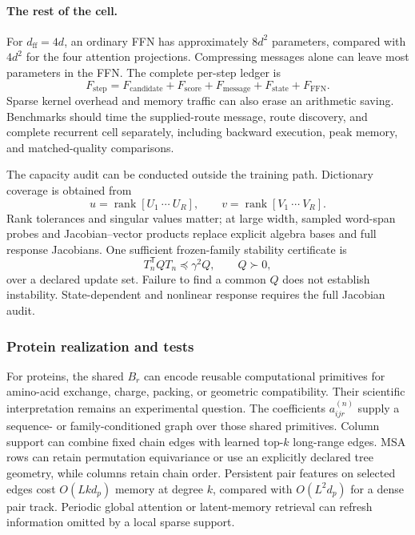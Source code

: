 \documentclass[10pt]{article}
\theoremstyle{definition}
\theoremstyle{remark}
\newcommand{\BookSubsection}[1]{\subsubsection{#1}}
\begin{document}
\paragraph{The rest of the cell.}
For $d_{\mathrm{ff}}=4d$, an ordinary FFN has approximately $8d^2$ parameters, compared with
$4d^2$ for the four attention projections.  Compressing messages alone can leave most parameters
in the FFN.  The complete per-step ledger is
\begin{equation}
F_{\mathrm{step}}
=F_{\mathrm{candidate}}+F_{\mathrm{score}}+F_{\mathrm{message}}
+F_{\mathrm{state}}+F_{\mathrm{FFN}}.
\label{eq:computational-cost-ledger}
\end{equation}
Sparse kernel overhead and memory traffic can also erase an arithmetic saving.  Benchmarks
should time the supplied-route message, route discovery, and complete recurrent cell separately,
including backward execution, peak memory, and matched-quality comparisons.

The capacity audit can be conducted outside the training path.  Dictionary coverage is obtained
from
\begin{equation}
u=\operatorname{rank}[U_1\ \cdots\ U_R],
\qquad
v=\operatorname{rank}[V_1\ \cdots\ V_R].
\label{eq:dictionary-coverage-rank-audit}
\end{equation}
Rank tolerances and singular values matter; at large width, sampled word-span probes and
Jacobian--vector products replace explicit algebra bases and full response Jacobians.  One
sufficient frozen-family stability certificate is
\begin{equation}
T_n^{\mathsf T}QT_n\preceq\gamma^2Q,
\qquad Q\succ0,
\label{eq:shared-update-stability}
\end{equation}
over a declared update set.  Failure to find a common $Q$ does not establish instability.
State-dependent and nonlinear response requires the full Jacobian audit.

\BookSubsection{Protein realization and tests}

For proteins, the shared $B_r$ can encode reusable computational primitives for amino-acid
exchange, charge, packing, or geometric compatibility.  Their scientific interpretation remains
an experimental question.  The coefficients $a_{ijr}^{(n)}$ supply a sequence- or
family-conditioned graph over those shared primitives.  Column support can combine fixed chain
edges with learned top-$k$ long-range edges.  MSA rows can retain permutation equivariance or use
an explicitly declared tree geometry, while columns retain chain order.  Persistent pair features
on selected edges cost $O(Lkd_p)$ memory at degree $k$, compared with $O(L^2d_p)$ for a dense pair
track.  Periodic global attention or latent-memory retrieval can refresh information omitted by a
local sparse support.
\end{document}
